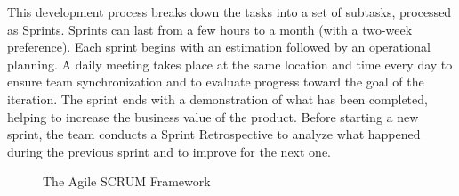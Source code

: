 This development process breaks down the tasks into a set of subtasks, processed as Sprints. Sprints can last from a few hours to a month (with a two-week preference). Each sprint begins with an estimation followed by an operational planning. A daily meeting takes place at the same location and time every day to ensure team synchronization and to evaluate progress toward the goal of the iteration. The sprint ends with a demonstration of what has been completed, helping to increase the business value of the product. Before starting a new sprint, the team conducts a Sprint Retrospective to analyze what happened during the previous sprint and to improve for the next one.

\begin{figure}[H]
    \centering
    \caption{ The Agile SCRUM Framework }
    \label{fig:Scrum_Methodology_Diagram}
\end{figure}


